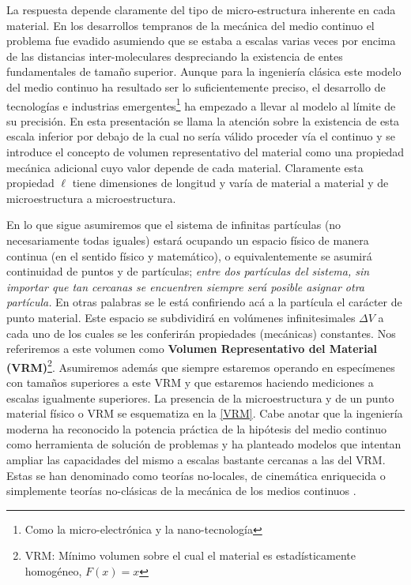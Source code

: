 \documentclass[../notas medios.tex]{subfiles}
\begin{document}
La respuesta depende claramente del tipo de micro-estructura inherente en cada 
material.  En los desarrollos tempranos de la mecánica del medio continuo el 
problema fue evadido asumiendo que se estaba a escalas varias veces por encima 
de las distancias inter-moleculares despreciando la existencia de entes 
fundamentales de tamaño superior.  Aunque para la ingeniería clásica este 
modelo del medio continuo ha resultado ser lo suficientemente preciso, el 
desarrollo de tecnologías e industrias emergentes\footnote{Como la 
micro-electrónica y la nano-tecnología} ha empezado a llevar al modelo al 
límite de su precisión.  En esta presentación se llama la atención sobre la 
existencia de esta escala inferior por debajo de la cual no sería válido 
proceder vía el continuo y se introduce el concepto de volumen representativo 
del material como una propiedad mecánica adicional cuyo valor depende de cada 
material.  Claramente esta propiedad $\ell$ tiene dimensiones de longitud y 
varía de material a material y de microestructura a microestructura.

En lo que sigue asumiremos que el sistema de infinitas partículas (no
necesariamente todas iguales) estará ocupando un espacio físico de manera 
continua (en el sentido físico y matemático), o equivalentemente se asumirá 
continuidad de puntos y de partículas; \emph{entre dos partículas del 
sistema, sin importar que tan cercanas se encuentren siempre será posible 
asignar otra partícula.} En otras palabras se le está confiriendo acá a la 
partícula el carácter de punto material.  Este espacio se subdividirá en 
volúmenes infinitesimales $\Delta V$ a cada uno de los cuales se les conferirán 
propiedades (mecánicas) constantes.  Nos referiremos a este volumen como 
\textbf{Volumen Representativo del Material  (VRM)}\footnote{VRM: Mínimo 
volumen sobre el cual el material es estadísticamente homogéneo, $F(x)=x$}.  
Asumiremos además que siempre estaremos operando en especímenes con tamaños 
superiores a este VRM y que estaremos haciendo mediciones a escalas igualmente 
superiores.  La presencia de la microestructura y de un punto material físico o 
VRM se esquematiza en la \cref{VRM}.  Cabe anotar que la ingeniería moderna ha 
reconocido la potencia práctica de la hipótesis del medio continuo como 
herramienta de solución de problemas y ha planteado modelos que intentan 
ampliar las capacidades del mismo a escalas bastante cercanas a las del VRM.  
Estas se han denominado como teorías no-locales, de cinemática enriquecida o 
simplemente teorías no-clásicas de la mecánica de los medios continuos 
\cite{voigt1887, toupin1962, mindlin1964, eringen1966, cosserat1909, aero1961}.
\end{document}
